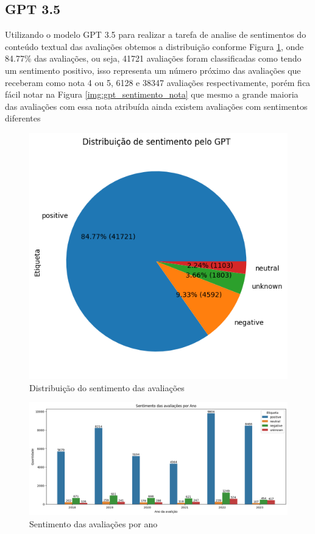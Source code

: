 \subsection{GPT 3.5}

Utilizando o modelo GPT 3.5 para realizar a tarefa de analise de sentimentos do conteúdo textual das avaliações obtemos a distribuição conforme Figura \ref{img:gpt_pizza_distribuicao}, onde 84.77\% das avaliações, ou seja, 41721 avaliações foram classificadas como tendo um sentimento positivo, isso representa um número próximo das avaliações que receberam como nota 4 ou 5, 6128 e 38347 avaliações respectivamente, porém fica fácil notar na Figura \ref{img:gpt_sentimento_nota} que mesmo a grande maioria das avaliações com essa nota atribuída ainda existem avaliações com sentimentos diferentes

\begin{figure}
	\centering
	\includegraphics[width=1\textwidth]{figs/gpt/distribuicao_pizza.png}
	\caption{Distribuição do sentimento das avaliações}
	\label{img:gpt_pizza_distribuicao}
\end{figure}

\begin{figure}
	\centering
	\includegraphics[width=1\textwidth]{figs/gpt/sentimento_ano.png}
	\caption{Sentimento das avaliações por ano}
	\label{img:gpt_sentimento_ano}
\end{figure}

